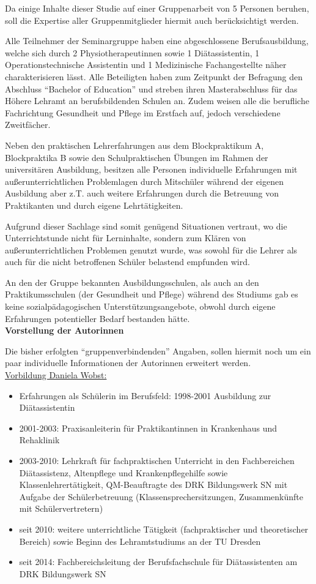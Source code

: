 Da einige Inhalte dieser Studie auf einer Gruppenarbeit von 5 Personen beruhen, soll die Expertise aller Gruppenmitglieder hiermit auch berücksichtigt werden.

Alle Teilnehmer der Seminargruppe haben eine abgeschlossene Berufsausbildung, welche sich durch 2 Physiotherapeutinnen sowie 1 Diätassistentin, 1 Operationstechnische Assistentin und 1 Medizinische Fachangestellte näher charakterisieren lässt. Alle Beteiligten haben zum Zeitpunkt der Befragung den Abschluss "`Bachelor of Education"' und streben ihren Masterabschluss für das Höhere Lehramt an berufsbildenden Schulen an. Zudem weisen alle die berufliche Fachrichtung Gesundheit und Pflege im Erstfach auf, jedoch verschiedene Zweitfächer.

Neben den praktischen Lehrerfahrungen aus dem Blockpraktikum A, Blockpraktika B sowie den Schulpraktischen Übungen im Rahmen der universitären Ausbildung, besitzen alle Personen individuelle Erfahrungen mit außerunterrichtlichen Problemlagen durch Mitschüler während der eigenen Ausbildung aber z.T. auch weitere Erfahrungen durch die Betreuung von Praktikanten und durch eigene Lehrtätigkeiten.

Aufgrund dieser Sachlage sind somit genügend Situationen vertraut, wo die Unterrichtstunde nicht für Lerninhalte, sondern zum Klären von außerunterrichtlichen Problemen genutzt wurde, was sowohl für die Lehrer als auch für die nicht betroffenen Schüler belastend empfunden wird.

An den der Gruppe bekannten Ausbildungsschulen, als auch an den Praktikumsschulen (der Gesundheit und Pflege) während des Studiums gab es keine sozialpädagogischen Unterstützungsangebote, obwohl durch eigene Erfahrungen potentieller Bedarf bestanden hätte.\\

\noindent
\textbf{Vorstellung der Autorinnen}

Die bisher erfolgten "`gruppenverbindenden"' Angaben, sollen hiermit noch um ein paar individuelle Informationen der Autorinnen erweitert werden.\\

\underline{Vorbildung Daniela Wobst:}\\
\begin{itemize}
	\item Erfahrungen als Schülerin im Berufsfeld: 1998-2001 Ausbildung zur Diätassistentin
	\item 2001-2003: Praxisanleiterin für Praktikantinnen in Krankenhaus und Rehaklinik
	\item 2003-2010: Lehrkraft für fachpraktischen Unterricht in den Fachbereichen Diätassistenz, Altenpflege und Krankenpflegehilfe sowie Klassenlehrertätigkeit, QM-Beauftragte des DRK Bildungswerk SN mit Aufgabe der Schülerbetreuung (Klassensprechersitzungen, Zusammenkünfte mit Schülervertretern)
	\item seit 2010: weitere unterrichtliche Tätigkeit (fachpraktischer und theoretischer Bereich) sowie Beginn des Lehramtstudiums an der TU Dresden
	\item seit 2014: Fachbereichsleitung der Berufsfachschule für Diätassistenten am DRK Bildungswerk SN
\end{itemize}

